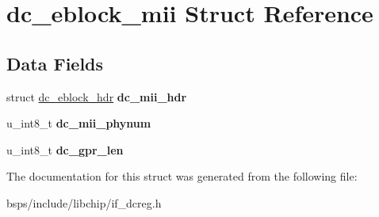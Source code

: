 \hypertarget{structdc__eblock__mii}{}\section{dc\+\_\+eblock\+\_\+mii Struct Reference}
\label{structdc__eblock__mii}
\subsection*{Data Fields}
\begin{DoxyCompactItemize}
\item 
\mbox{\label{structdc__eblock__mii_a2cc2d814def2b345fe733901f4c5b88a}} 
struct \mbox{\hyperlink{structdc__eblock__hdr}{dc\+\_\+eblock\+\_\+hdr}} {\bfseries dc\+\_\+mii\+\_\+hdr}
\item 
\mbox{\label{structdc__eblock__mii_afa922c9c3c956e3708ab46c8c73db849}} 
u\+\_\+int8\+\_\+t {\bfseries dc\+\_\+mii\+\_\+phynum}
\item 
\mbox{\label{structdc__eblock__mii_a472a8f2f7fa3ab9aae397a7727970b48}} 
u\+\_\+int8\+\_\+t {\bfseries dc\+\_\+gpr\+\_\+len}
\end{DoxyCompactItemize}


The documentation for this struct was generated from the following file\+:\begin{DoxyCompactItemize}
\item 
bsps/include/libchip/if\+\_\+dcreg.\+h\end{DoxyCompactItemize}
